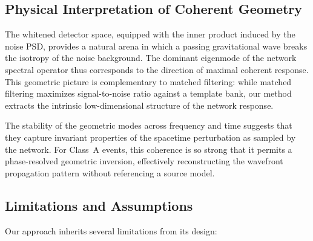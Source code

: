 \documentclass[11pt,a4paper]{article}
\begin{document}
\subsection{Physical Interpretation of Coherent Geometry}
The whitened detector space, equipped with the inner product induced by the noise PSD, provides a natural arena in which a passing gravitational wave breaks the isotropy of the noise background. The dominant eigenmode of the network spectral operator thus corresponds to the direction of maximal coherent response. This geometric picture is complementary to matched filtering: while matched filtering maximizes signal-to-noise ratio against a template bank, our method extracts the intrinsic low-dimensional structure of the network response.

The stability of the geometric modes across frequency and time suggests that they capture invariant properties of the spacetime perturbation as sampled by the network. For Class~A events, this coherence is so strong that it permits a phase-resolved geometric inversion, effectively reconstructing the wavefront propagation pattern without referencing a source model.

\subsection{Limitations and Assumptions}
Our approach inherits several limitations from its design:
\end{document}
